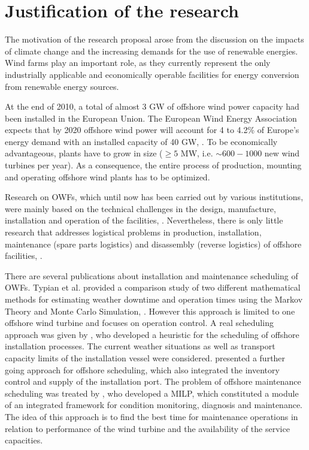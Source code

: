 \section{Justification of the research}
The motivation of the research proposal arose from the discussion on the impacts of climate change and the increasing demands for the use of renewable energies. Wind farms play an important role, as they currently represent the only industrially applicable and economically operable facilities for energy conversion from renewable energy sources.

At the end of 2010, a total of almost 3 GW of offshore wind power capacity had been installed in the European Union. The European Wind Energy Association expects that by 2020 offshore wind power will account for 4 to 4.2\% of Europe's energy demand with an installed capacity of 40 GW, \cite{EWEA2011, Kaldellis2013}.
To be economically advantageous, plants have to grow in size ($\geq 5$ MW, i.e. $\sim600-1000$ new wind turbines per year). As a consequence, the entire process of production, mounting and operating offshore wind plants has to be optimized.

Research on OWFs, which until now has been carried out by various institutions, were mainly based on the technical challenges in the design, manufacture, installation and operation of the facilities, \cite{Miller2013, SerranoGonzalez2014, Perveen2014}. Nevertheless, there is only little research that addresses logistical problems in production, installation, maintenance (spare parts logistics) and disassembly (reverse logistics) of offshore facilities, \cite{Scholz2010, Lange2012, COMPIT11, COMPIT12, aitsimulation, thalji2012}.

There are several publications about installation and maintenance scheduling of OWFs. Typian et al. provided a comparison study of two different mathematical methods for estimating weather downtime and operation times using the Markov Theory and Monte Carlo Simulation, \cite{Tyapin2011}. However this approach is limited to one offshore wind turbine and focuses on operation control. A real scheduling approach was given by \cite{Scholz2010}, who developed a heuristic for the scheduling of offshore installation processes. The current weather situations as well as transport capacity limits of the installation vessel were considered. \cite{ISOPE2012} presented a further going approach for offshore scheduling, which also integrated the inventory control and supply of the installation port.
The problem of offshore maintenance scheduling was treated by \cite{Kovacs2011497}, who developed a MILP, which constituted a module of an integrated framework for condition monitoring, diagnosis and maintenance. The idea of this approach is to find the best time for maintenance operations in relation to performance of the wind turbine and the availability of the service capacities.

